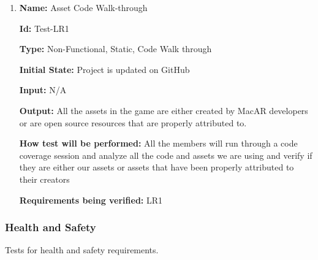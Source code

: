 \documentclass[12pt, titlepage]{article}
\begin{document}
\begin{enumerate}

\item{\textbf{Name:} Asset Code Walk-through}

\textbf{Id:} Test-LR1

\textbf{Type:} Non-Functional, Static, Code Walk through
					
\textbf{Initial State:} Project is updated on GitHub
					
\textbf{Input:} N/A
					
\textbf{Output:} All the assets in the game are either created by MacAR developers or are open source resources that are properly attributed to. 
					
\textbf{How test will be performed:} All the members will run through a code coverage session and analyze all the code and assets we are using and verify if they are either our assets or assets that have been properly attributed to their creators

\textbf{Requirements being verified:} LR1
					
\end{enumerate}

\subsubsection{Health and Safety}
Tests for health and safety requirements. 
\end{document}
